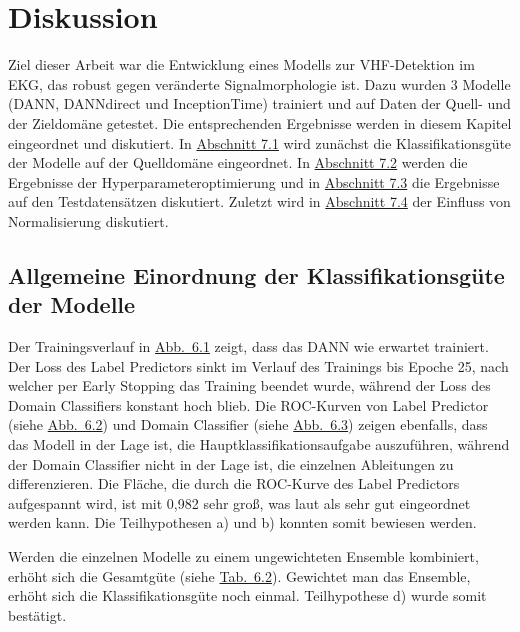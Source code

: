 \chapter{Diskussion}\label{chap:diskussion}

Ziel dieser Arbeit war die Entwicklung eines Modells zur \gls{VHF}-Detektion im \gls{EKG}, das robust gegen veränderte Signalmorphologie ist. Dazu wurden 3 Modelle (\gls{DANN}, DANNdirect und InceptionTime) trainiert und auf Daten der Quell- und der Zieldomäne getestet. Die entsprechenden Ergebnisse werden in diesem Kapitel eingeordnet und diskutiert. In \hyperref[sec:einordnung]{Abschnitt 7.1} wird zunächst die Klassifikationsgüte der Modelle auf der Quelldomäne eingeordnet. In \hyperref[sec:diskhyper]{Abschnitt 7.2} werden die Ergebnisse der Hyperparameteroptimierung und in \hyperref[sec:disktest]{Abschnitt 7.3} die Ergebnisse auf den Testdatensätzen diskutiert. Zuletzt wird in \hyperref[sec:disknorm]{Abschnitt 7.4} der Einfluss von Normalisierung diskutiert.

\section{Allgemeine Einordnung der Klassifikationsgüte der Modelle}\label{sec:einordnung}

Der Trainingsverlauf in \hyperref[fig:DANN_training]{Abb.~6.1} zeigt, dass das \gls{DANN} wie erwartet trainiert. Der Loss des Label Predictors sinkt im Verlauf des Trainings bis Epoche 25, nach welcher per Early Stopping das Training beendet wurde, während der Loss des Domain Classifiers konstant hoch blieb. Die \gls{ROC}-Kurven von Label Predictor (siehe \hyperref[fig:DANN_label_roc]{Abb.~6.2}) und Domain Classifier (siehe \hyperref[fig:DANN_domain_roc]{Abb.~6.3}) zeigen ebenfalls, dass das Modell in der Lage ist, die Hauptklassifikationsaufgabe auszuführen, während der Domain Classifier nicht in der Lage ist, die einzelnen Ableitungen zu differenzieren. Die Fläche, die durch die \gls{ROC}-Kurve des Label Predictors aufgespannt wird, ist mit 0,982 sehr groß, was laut \cite{mandrekar_receiver_2010} als sehr gut eingeordnet werden kann. Die Teilhypothesen a) und b) konnten somit bewiesen werden.

Werden die einzelnen Modelle zu einem ungewichteten Ensemble kombiniert, erhöht sich die Gesamtgüte (siehe \hyperref[tab:Ergebnisse_indomain]{Tab.~6.2}). Gewichtet man das Ensemble, erhöht sich die Klassifikationsgüte noch einmal. Teilhypothese d) wurde somit bestätigt.

